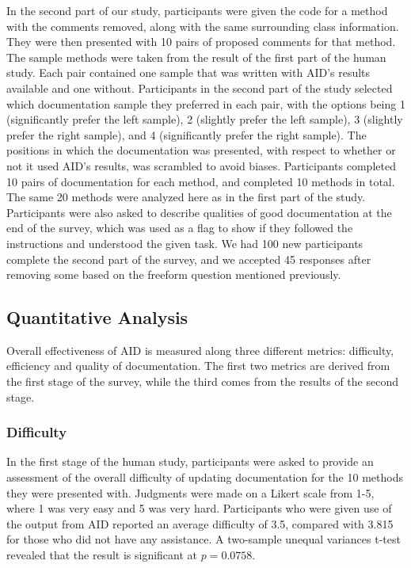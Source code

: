 \documentclass[preprint]{sigplanconf}
\begin{document}
In the second part of our study, participants were given the code for a method with the comments removed, along with the same surrounding class information. They were then presented with 10 pairs of proposed comments for that method. The sample methods were taken from the result of the first part of the human study. Each pair contained one sample that was written with AID's results available and one without. Participants in the second part of the study selected which documentation sample they preferred in each pair, with the options being 1 (significantly prefer the left sample), 2 (slightly prefer the left sample), 3 (slightly prefer the right sample), and 4 (significantly prefer the right sample). The positions in which the documentation was presented, with respect to whether or not it used AID's results, was scrambled to avoid biases. Participants completed 10 pairs of documentation for each method, and completed 10 methods in total. The same 20 methods were analyzed here as in the first part of the study. Participants were also asked to describe qualities of good documentation at the end of the survey, which was used as a flag to show if they followed the instructions and understood the given task. We had 100 new participants complete the second part of the survey, and we accepted 45 responses after removing some based on the freeform question mentioned previously.

\subsection{Quantitative Analysis}
Overall effectiveness of AID is measured along three different metrics: difficulty, efficiency and quality of documentation. The first two metrics are derived from the first stage of the survey, while the third comes from the results of the second stage.

\subsubsection{Difficulty}
In the first stage of the human study, participants were asked to provide an assessment of the overall difficulty of updating documentation for the 10 methods they were presented with. Judgments were made on a Likert scale from 1-5, where 1 was very easy and 5 was very hard. Participants who were given use of the output from AID reported an average difficulty of 3.5, compared with 3.815 for those who did not have any assistance. A two-sample unequal variances t-test revealed that the result is significant at \(p = 0.0758\).
\end{document}

